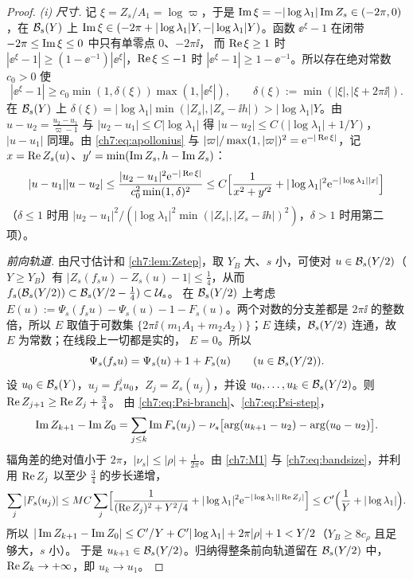 \begin{proof}
\emph{(i) 尺寸.} 记 $\xi=Z_s/A_1=\log\varpi$，于是 $\operatorname{Im}\xi=-|\log\lambda_1|\operatorname{Im} Z_s\in(-2\pi,0)$，在 $\mathcal B_s(Y)$ 上
$\operatorname{Im}\xi\in(-2\pi+|\log\lambda_1|Y,-|\log\lambda_1|Y)$。函数 $\ee^\xi-1$ 在闭带 $-2\pi\le\operatorname{Im}\xi\le0$ 中只有单零点 $0$、$-2\pi\ii$，
而 $\operatorname{Re}\xi\ge1$ 时 $|\ee^\xi-1|\ge(1-\ee^{-1})|\ee^\xi|$，$\operatorname{Re}\xi\le-1$ 时 $|\ee^\xi-1|\ge1-\ee^{-1}$。所以存在绝对常数 $c_0>0$ 使
\[
 |\ee^\xi-1|\ge c_0\min(1,\delta(\xi))\max(1,|\ee^\xi|),\qquad \delta(\xi):=\min(|\xi|,|\xi+2\pi\ii|).
\]
在 $\mathcal B_s(Y)$ 上 $\delta(\xi)=|\log\lambda_1|\min(|Z_s|,|Z_s-\ii h|)>|\log\lambda_1|Y$。由 $u-u_2=\frac{u_2-u_1}{\varpi-1}$ 与
$|u_2-u_1|\le C|\log\lambda_1|$ 得 $|u-u_2|\le C(|\log\lambda_1|+1/Y)$，$|u-u_1|$ 同理。由 \eqref{ch7:eq:apollonius} 与
$|\varpi|/\max(1,|\varpi|)^2=\mathrm{e}^{-|\operatorname{Re}\xi|}$，记 $x=\operatorname{Re} Z_s(u)$、$y'=\min(\operatorname{Im} Z_s,h-\operatorname{Im} Z_s)$：
\begin{equation}\label{ch7:eq:bandsize}
 |u-u_1||u-u_2|\le\frac{|u_2-u_1|^2\mathrm{e}^{-|\operatorname{Re}\xi|}}{c_0^2\min(1,\delta)^2}
 \le C\Bigl[\frac1{x^2+y'^2}+|\log\lambda_1|^2\mathrm{e}^{-|\log\lambda_1||x|}\Bigr]
\end{equation}
（$\delta\le1$ 时用 $|u_2-u_1|^2/(|\log\lambda_1|^2\min(|Z_s|,|Z_s-\ii h|)^2)$，$\delta>1$ 时用第二项）。

\emph{前向轨道.} 由尺寸估计和 \cref{ch7:lem:Zstep}，取 $Y_B$ 大、$s$ 小，可使对 $u\in\mathcal B_s(Y/2)$（$Y\ge Y_B$）有
$|Z_s(f_su)-Z_s(u)-1|\le\frac14$，从而 $f_s(\mathcal B_s(Y/2))\subset\mathcal B_s(Y/2-\frac14)\subset\mathcal U_s$。
在 $\mathcal B_s(Y/2)$ 上考虑 $E(u):=\Psi_s(f_su)-\Psi_s(u)-1-F_s(u)$。两个对数的分支差都是 $2\pi\ii$ 的整数倍，所以
$E$ 取值于可数集 $\{2\pi\ii(m_1A_1+m_2A_2)\}$；$E$ 连续，$\mathcal B_s(Y/2)$ 连通，故 $E$ 为常数；在线段上一切都是实的，
$E=0$。所以
\begin{equation}\label{ch7:eq:Psi-step}
 \Psi_s(f_su)=\Psi_s(u)+1+F_s(u)\qquad(u\in\mathcal B_s(Y/2)).
\end{equation}
设 $u_0\in\mathcal B_s(Y)$，$u_j=f_s^ju_0$，$Z_j=Z_s(u_j)$，并设 $u_0,\dots,u_k\in\mathcal B_s(Y/2)$。则 $\operatorname{Re} Z_{j+1}\ge\operatorname{Re} Z_j+\frac34$。
由 \eqref{ch7:eq:Psi-branch}、\eqref{ch7:eq:Psi-step}，
\[
 \operatorname{Im} Z_{k+1}-\operatorname{Im} Z_0=\sum_{j\le k}\operatorname{Im} F_s(u_j)-\nu_s\bigl[\arg(u_{k+1}-u_2)-\arg(u_0-u_2)\bigr].
\]
辐角差的绝对值小于 $2\pi$，$|\nu_s|\le|\rho|+\frac1{2\pi}$。由 \ref{ch7:M1} 与 \eqref{ch7:eq:bandsize}，并利用 $\operatorname{Re} Z_j$ 以至少 $\frac34$ 的步长递增，
\[
 \sum_j|F_s(u_j)|\le MC\sum_j\Bigl[\frac1{(\operatorname{Re} Z_j)^2+Y^2/4}+|\log\lambda_1|^2\mathrm{e}^{-|\log\lambda_1||\operatorname{Re} Z_j|}\Bigr]
 \le C'\Bigl(\frac1Y+|\log\lambda_1|\Bigr).
\]
所以 $|\operatorname{Im} Z_{k+1}-\operatorname{Im} Z_0|\le C'/Y+C'|\log\lambda_1|+2\pi|\rho|+1<Y/2$（$Y_B\ge8c_\rho$ 且足够大，$s$ 小）。
于是 $u_{k+1}\in\mathcal B_s(Y/2)$。归纳得整条前向轨道留在 $\mathcal B_s(Y/2)$ 中，$\operatorname{Re} Z_k\to+\infty$，即 $u_k\to u_1$。


\end{proof}
